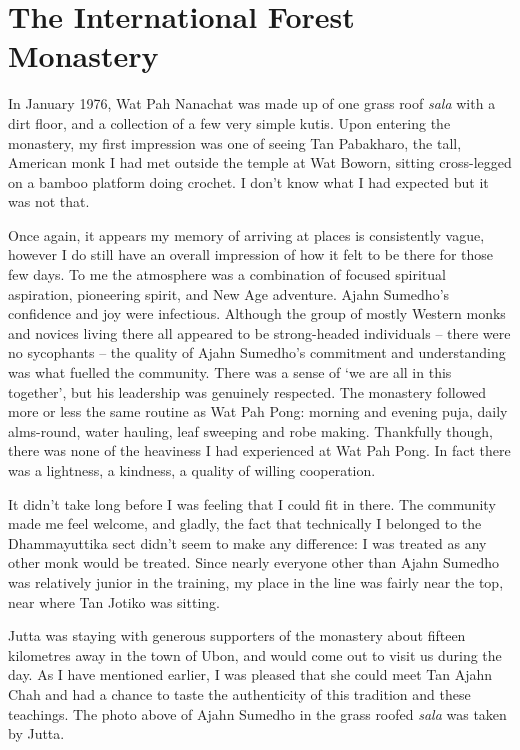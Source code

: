 \chapter{The International Forest Monastery}

In January 1976, Wat Pah Nanachat was made up of one grass roof
\emph{sala} with a dirt floor, and a collection of a few very simple
kutis. Upon entering the monastery, my first impression was one of
seeing Tan Pabakharo, the tall, American monk I had met outside the
temple at Wat Boworn, sitting cross-legged on a bamboo platform doing
crochet. I don't know what I had expected but it was not that.

Once again, it appears my memory of arriving at places is consistently
vague, however I do still have an overall impression of how it felt to
be there for those few days. To me the atmosphere was a combination of
focused spiritual aspiration, pioneering spirit, and New Age adventure.
Ajahn Sumedho's confidence and joy were infectious. Although the group
of mostly Western monks and novices living there all appeared to be
strong-headed individuals -- there were no sycophants -- the quality of
Ajahn Sumedho's commitment and understanding was what fuelled the
community. There was a sense of `we are all in this together', but his
leadership was genuinely respected. The monastery followed more or less
the same routine as Wat Pah Pong: morning and evening puja, daily
alms-round, water hauling, leaf sweeping and robe making. Thankfully
though, there was none of the heaviness I had experienced at Wat Pah
Pong. In fact there was a lightness, a kindness, a quality of willing
cooperation.


It didn't take long before I was feeling that I could fit in there. The
community made me feel welcome, and gladly, the fact that technically I
belonged to the Dhammayuttika sect didn't seem to make any difference: I
was treated as any other monk would be treated. Since nearly everyone
other than Ajahn Sumedho was relatively junior in the training, my place
in the line was fairly near the top, near where Tan Jotiko was sitting.

Jutta was staying with generous supporters of the monastery about
fifteen kilometres away in the town of Ubon, and would come out to visit
us during the day. As I have mentioned earlier, I was pleased that she
could meet Tan Ajahn Chah and had a chance to taste the authenticity of
this tradition and these teachings. The photo above of Ajahn Sumedho in
the grass roofed \emph{sala} was taken by Jutta.


